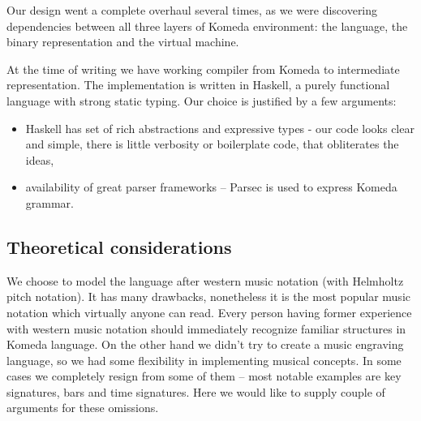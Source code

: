 \documentclass{article}
\begin{document}
Our design went a complete overhaul several times, as we were discovering
dependencies between all three layers of Komeda environment: the language, the
binary representation and the virtual machine.

At the time of writing we have working compiler from Komeda to intermediate
representation. The implementation is written in Haskell, a purely functional
language with strong static typing. Our choice is justified by a few arguments:

\begin{itemize}
    \setlength{\itemsep}{0pt}
  \item Haskell \cite{haskell} has set of rich abstractions and expressive
    types - our code looks clear and simple, there is little verbosity or
    boilerplate code, that obliterates the ideas,
  \item availability of great parser frameworks -- Parsec \cite{parsec} is used
    to express Komeda grammar.
\end{itemize}

\subsection{Theoretical considerations}
\label{lang:theory}

We choose to model the language after western music notation (with Helmholtz
pitch notation).  It has many drawbacks, nonetheless it is the most popular
music notation which virtually anyone can read.  Every person having former
experience with western music notation should immediately recognize familiar
structures in Komeda language.  On the other hand we didn't try to create a
music engraving language, so we had some flexibility in implementing musical
concepts. In some cases we completely resign from some of them -- most notable
examples are key signatures, bars and time signatures.  Here we would like to
supply couple of arguments for these omissions.
\end{document}
